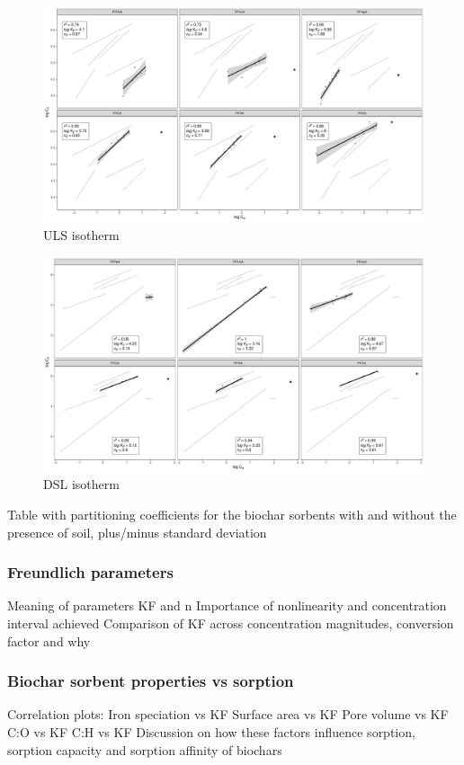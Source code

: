 \begin{figure}
    \centering
    \includegraphics[width=\textwidth]{R/figs/ULS_facet_isotherm.pdf}
    \caption{ULS isotherm}
    \label{fig:ULS_isotherm}
\end{figure}

\begin{figure}
    \centering
    \includegraphics[width=\textwidth]{R/figs/DSL_facet_isotherm.pdf}
    \caption{DSL isotherm}
    \label{fig:DSL_isotherm}
\end{figure}
Table with partitioning coefficients for the biochar sorbents with and without the presence of soil, plus/minus standard deviation
\subsubsection{Freundlich parameters}
Meaning of parameters KF and n
Importance of nonlinearity and concentration interval achieved 
Comparison of KF across concentration magnitudes, conversion factor and why

\subsubsection{Biochar sorbent properties vs sorption}
Correlation plots:
    Iron speciation vs KF
    Surface area vs KF 
    Pore volume vs KF 
    C:O vs KF 
    C:H vs KF  
Discussion on how these factors influence sorption, sorption capacity and sorption affinity of biochars

